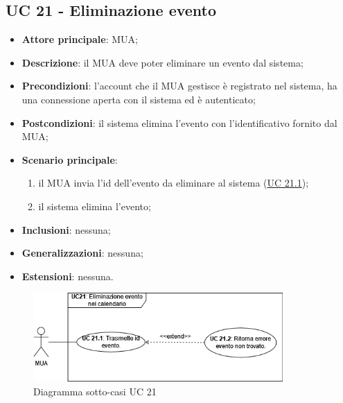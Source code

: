 \subsection{UC 21 - Eliminazione evento} \label{sec:UC21}
    \begin{itemize}
        \item \textbf{Attore principale}: MUA;
        \item \textbf{Descrizione}: il MUA deve poter eliminare un evento dal sistema;
        \item \textbf{Precondizioni}: l’account che il MUA gestisce è registrato nel sistema, ha una connessione aperta con il sistema ed è autenticato;
        \item \textbf{Postcondizioni}: il sistema elimina l'evento con l'identificativo fornito dal MUA;
        \item \textbf{Scenario principale}:
            \begin{enumerate}
                \item il MUA invia l'id dell'evento da eliminare al sistema (\hyperref[sec:UC21.1]{UC 21.1});
                \item il sistema elimina l'evento;
            \end{enumerate}
        \item \textbf{Inclusioni}: nessuna;
        \item \textbf{Generalizzazioni}: nessuna;
        \item \textbf{Estensioni}: nessuna.
    \end{itemize}

\begin{figure}[h]
    \includegraphics[width=0.85\textwidth]{sections/uc_imgs/UC21.png}
    \centering
    \caption{Diagramma sotto-casi UC 21}
\end{figure}

